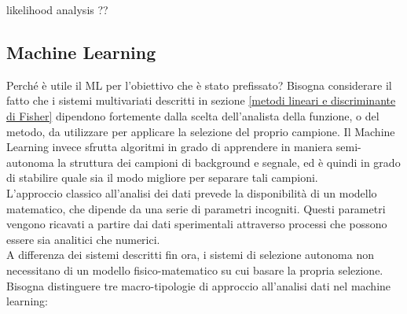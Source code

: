 \color{red}
likelihood analysis ?? \\
\color{black}

\newpage
\subsection{Machine Learning}
\label{ML}

Perché è utile il ML per l'obiettivo che è stato prefissato? Bisogna considerare il fatto che i sistemi multivariati descritti in sezione \ref{metodi lineari e discriminante di Fisher} dipendono fortemente dalla scelta dell'analista della funzione, o del metodo, da utilizzare per applicare la selezione del proprio campione. Il Machine Learning invece sfrutta algoritmi in grado di apprendere in maniera semi-autonoma la struttura dei campioni di background e segnale, ed è quindi in grado di stabilire quale sia il modo migliore per separare tali campioni. \\
L'approccio classico all'analisi dei dati prevede la disponibilità di un modello matematico, che dipende da una serie di parametri incogniti. Questi parametri vengono ricavati a partire dai dati sperimentali attraverso processi che possono essere sia analitici che numerici. \\
A differenza dei sistemi descritti fin ora, i sistemi di selezione autonoma non necessitano di un modello fisico-matematico su cui basare la propria selezione. \\
Bisogna distinguere tre macro-tipologie di approccio all'analisi dati nel machine learning:
